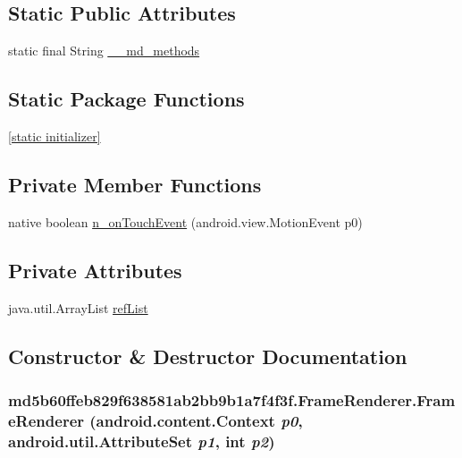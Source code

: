 \subsection*{Static Public Attributes}
\begin{CompactItemize}
\item 
static final String \hyperlink{classmd5b60ffeb829f638581ab2bb9b1a7f4f3f_1_1_frame_renderer_d51663e7802471a9ec8a28e818f4c43f}{\_\-\_\-md\_\-methods}
\end{CompactItemize}
\subsection*{Static Package Functions}
\begin{CompactItemize}
\item 
\hyperlink{classmd5b60ffeb829f638581ab2bb9b1a7f4f3f_1_1_frame_renderer_f90b327fd28f92712dac1abd641877e1}{\mbox{[}static initializer\mbox{]}}
\end{CompactItemize}
\subsection*{Private Member Functions}
\begin{CompactItemize}
\item 
native boolean \hyperlink{classmd5b60ffeb829f638581ab2bb9b1a7f4f3f_1_1_frame_renderer_f5975cde0cd3d4980507d2033988a61d}{n\_\-onTouchEvent} (android.view.MotionEvent p0)
\end{CompactItemize}
\subsection*{Private Attributes}
\begin{CompactItemize}
\item 
java.util.ArrayList \hyperlink{classmd5b60ffeb829f638581ab2bb9b1a7f4f3f_1_1_frame_renderer_21cc95191ee8ae27b886228f196f3939}{refList}
\end{CompactItemize}


\subsection{Constructor \& Destructor Documentation}
\hypertarget{classmd5b60ffeb829f638581ab2bb9b1a7f4f3f_1_1_frame_renderer_985beedccde288d3e108b2fbc0ac7eb9}{
\subsubsection[{FrameRenderer}]{\setlength{\rightskip}{0pt plus 5cm}md5b60ffeb829f638581ab2bb9b1a7f4f3f.FrameRenderer.FrameRenderer (android.content.Context {\em p0}, \/  android.util.AttributeSet {\em p1}, \/  int {\em p2})}}
\label{classmd5b60ffeb829f638581ab2bb9b1a7f4f3f_1_1_frame_renderer_985beedccde288d3e108b2fbc0ac7eb9}


